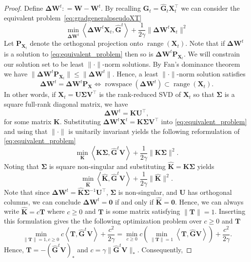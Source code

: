 \documentclass[11pt]{article}
\newcommand{\mat}[1]{\bm{#1}}
\newcommand{\dotprod}[1]{\left< #1\right>}
\newcommand{\mG}{\mat{ G}}
\newcommand{\mK}{\mat{ K}}
\newcommand{\mX}{\mat{ X}}
\newcommand{\mW}{\mat{ W}}
\newcommand{\DW}{\mat{ \Delta W}}
\newcommand{\mP}{\mat{ P}}
\newcommand{\mT}{\mat{ T}}
\newcommand{\mU}{\mat{ U}}
\newcommand{\mV}{\mat{ V}}
\DeclareMathOperator{\Range}{range}
\DeclareMathOperator{\rowspace}{rowspace}
\begin{document}
\begin{proof}  
Define $\DW^t : = \mW- \mW^t$. 
By recalling $\mG_t = \hat{\mG}_t \mX_t^{\top}$ we can consider the equivalent problem~\eqref{eq:gradgeneralpseudoXT}
\begin{equation}\label{eq:equivalent_problem}
    \min\limits_{\DW^t} \dotprod{\DW^t\mX_t, \hat{\mG}^t } + \frac{1}{2\gamma}\|\DW^t \mX_t\|^2    
\end{equation}
Let $\mP_{\mX_t}$ denote the orthogonal projection onto $\Range(\mX_t)$. Note that if $\DW^t$ is a solution to \eqref{eq:equivalent_problem} then so is $\DW^t\mP_{\mX_t}$. We will constrain our solution set to be least $\|\cdot\|$-norm solutions. By Fan's dominance theorem \cite[Theorem IV.2.2]{bhatia} we have $\|\DW^t\mP_{\mX_t}\| \leq \|\DW^t\|$. Hence, a least $\|\cdot\|$-norm solution satisfies
\[ \DW^t = \DW^t\mP_{\mX} \Leftrightarrow\rowspace(\DW^t) \subset \Range(\mX_t).\]
In other words, if $\mX_t = \mU \bm{\Sigma} \mV^{\top}$ is the rank-reduced SVD of $\bm{X}_t$ so that $\bm{\Sigma}$ is a square full-rank diagonal matrix, we have
\begin{equation*}
    \DW^t = \mK \mU^{\top},
\end{equation*}
for some matrix $\mK$. Substituting $\DW^{t} \bm{X}^t = \bm{K} \bm{\Sigma} \bm{V}^{\top}$ into \eqref{eq:equivalent_problem} and using that $\|\cdot\|$ is unitarily invariant yields the following reformulation of \eqref{eq:equivalent_problem}
\[ \min_{\bm{K}} \dotprod{\mK\bm{\Sigma}, \hat{\mG}^t\mV } + \frac{1}{2\gamma} \|\mK\bm{\Sigma}\|^2.\]
Noting that $\bm{\Sigma}$ is square non-singular and substituting $\hat{\mK} = \bm{K}\bm{\Sigma}$ yields
\[ \min_{\hat{\bm{K}}} \dotprod{\hat{\mK}, \hat{\mG}^t\mV } + \frac{1}{2\gamma} \|\hat{\mK}\|^2.\]
Note that since $\DW^t = \hat{\mK} \bm{\Sigma}^{-1} \mU^{\top}$, $\bm{\Sigma}$ is non-singular, and $\mU$ has orthogonal columns, we can conclude $\DW^t = \bm{0}$ if and only if $\hat{\mK} = \bm{0}$. Hence, we can always  write $\hat{\mK} = c\mT$ where $c \geq 0$ and $\mT$ is some matrix satisfying $\|\mT\| = 1$. Inserting this formulation gives the the following optimization problem over $c \geq 0$ and $\mT$ 
\begin{equation*}
    \min\limits_{\|\mT\| = 1, c \geq 0} c\dotprod{\mT,\hat{\mG}^t \mV} + \frac{c^2}{2\gamma} = \min\limits_{c \geq 0} c \left(\min\limits_{\|\bm{T}\| = 1} \dotprod{\mT,\hat{\mG} \mV}\right) + \frac{c^2}{2\gamma}.
\end{equation*}
Hence, $\mT = - (\hat{\mG}^t \mV)_*$ and $c =\gamma\|\hat{\mG}^t \mV\|_*$. Consequently,

\end{proof}
\end{document}
